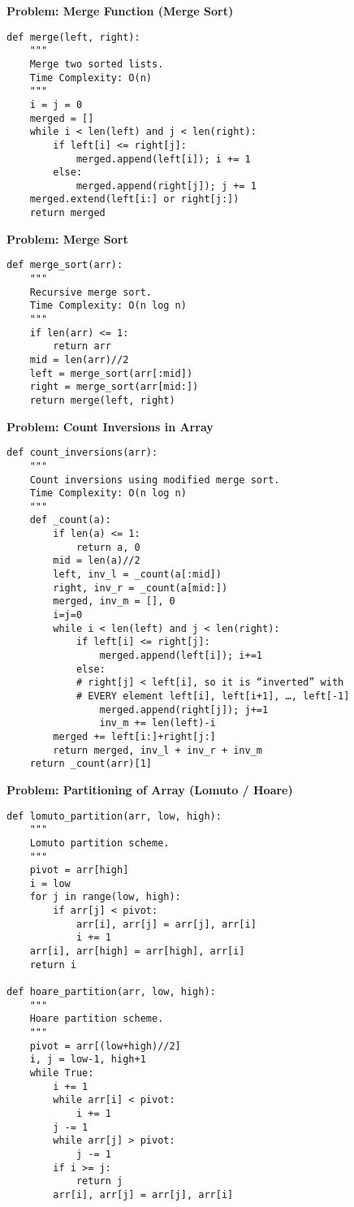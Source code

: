 \noindent\textbf{Problem: Merge Function (Merge Sort)}
\begin{verbatim}
def merge(left, right):
    """
    Merge two sorted lists.
    Time Complexity: O(n)
    """
    i = j = 0
    merged = []
    while i < len(left) and j < len(right):
        if left[i] <= right[j]:
            merged.append(left[i]); i += 1
        else:
            merged.append(right[j]); j += 1
    merged.extend(left[i:] or right[j:])
    return merged
\end{verbatim}

\noindent\textbf{Problem: Merge Sort}
\begin{verbatim}
def merge_sort(arr):
    """
    Recursive merge sort.
    Time Complexity: O(n log n)
    """
    if len(arr) <= 1:
        return arr
    mid = len(arr)//2
    left = merge_sort(arr[:mid])
    right = merge_sort(arr[mid:])
    return merge(left, right)
\end{verbatim}

\noindent\textbf{Problem: Count Inversions in Array}
\begin{verbatim}
def count_inversions(arr):
    """
    Count inversions using modified merge sort.
    Time Complexity: O(n log n)
    """
    def _count(a):
        if len(a) <= 1:
            return a, 0
        mid = len(a)//2
        left, inv_l = _count(a[:mid])
        right, inv_r = _count(a[mid:])
        merged, inv_m = [], 0
        i=j=0
        while i < len(left) and j < len(right):
            if left[i] <= right[j]:
                merged.append(left[i]); i+=1
            else:
            # right[j] < left[i], so it is “inverted” with
            # EVERY element left[i], left[i+1], …, left[-1]
                merged.append(right[j]); j+=1
                inv_m += len(left)-i
        merged += left[i:]+right[j:]
        return merged, inv_l + inv_r + inv_m
    return _count(arr)[1]
\end{verbatim}

\noindent\textbf{Problem: Partitioning of Array (Lomuto / Hoare)}
\begin{verbatim}
def lomuto_partition(arr, low, high):
    """
    Lomuto partition scheme.
    """
    pivot = arr[high]
    i = low
    for j in range(low, high):
        if arr[j] < pivot:
            arr[i], arr[j] = arr[j], arr[i]
            i += 1
    arr[i], arr[high] = arr[high], arr[i]
    return i

def hoare_partition(arr, low, high):
    """
    Hoare partition scheme.
    """
    pivot = arr[(low+high)//2]
    i, j = low-1, high+1
    while True:
        i += 1
        while arr[i] < pivot:
            i += 1
        j -= 1
        while arr[j] > pivot:
            j -= 1
        if i >= j:
            return j
        arr[i], arr[j] = arr[j], arr[i]
\end{verbatim}

